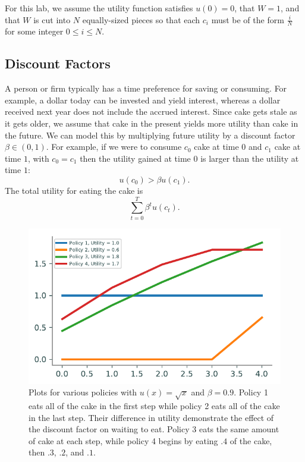 For this lab, we assume the utility function satisfies $u(0) = 0$, that $W = 1$, and that $W$ is cut into $N$ equally-sized pieces so that each $c_i$ must be of the form $\frac{i}{N}$ for some integer $0\leq i \leq N$.

\subsection*{Discount Factors} %

A person or firm typically has a time preference for saving or consuming.
For example, a dollar today can be invested and yield interest, whereas a dollar received next year does not include the accrued interest.
Since cake gets stale as it gets older, we assume that cake in the present yields more utility than cake in the future.
We can model this by multiplying future utility by a discount factor $\beta \in (0,1)$.
For example, if we were to consume $c_0$ cake at time $0$ and $c_1$ cake at time $1$, with $c_0 = c_1$ then the utility gained at time $0$ is larger than the utility at time $1$:
\[
u(c_0) > \beta u(c_1).
\]
The total utility for eating the cake is
\[
\sum_{t=0}^T \beta^t u(c_t).
\]

\begin{figure}[H]
\includegraphics[width=.7\textwidth]{figures/diff_policies.pdf}
\caption{Plots for various policies with $u(x) = \sqrt{x}$ and $\beta = 0.9$.
Policy 1 eats all of the cake in the first step while policy 2 eats all of the cake in the last step.
Their difference in utility demonstrate the effect of the discount factor on waiting to eat.
Policy 3 eats the same amount of cake at each step, while policy 4 begins by eating $.4$ of the cake, then $.3$, $.2$, and $.1$.}
\label{fig:diff_pols}
\end{figure}



